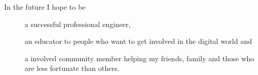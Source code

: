
\begin{cvparagraph}

In the future I hope to be
\begin{description}
  \item[] a successful professional engineer,
  \item[] an educator to people who want to get involved in the digital world and
  \item[] a involved community member helping my friends, family and those who are less fortunate than others.
\end{description}


\end{cvparagraph}
